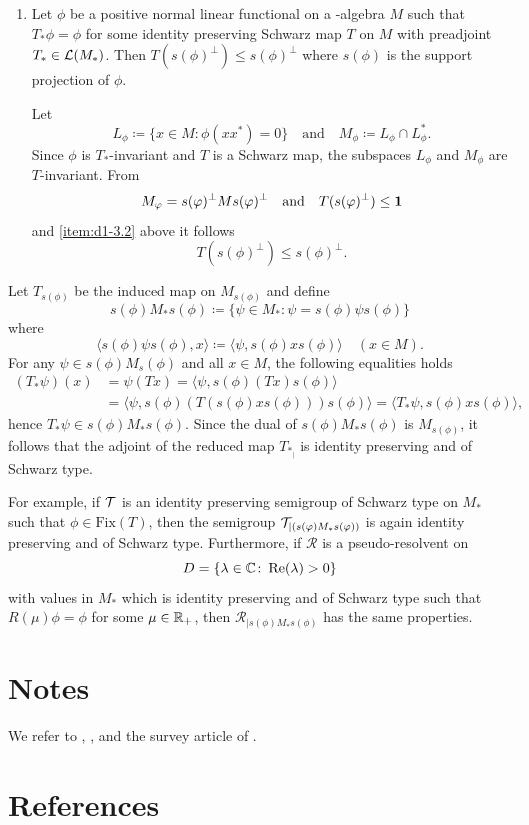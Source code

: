 \begin{enumerate}[1., wide, labelindent=.25em]
\item
Let $ \phi $ be a positive normal linear functional on a \WA-algebra $ M $ such that $ T_{*}\phi = \phi $ for some identity preserving Schwarz map $ T $ on $ M $ with preadjoint 
$ T_{*} \in \mathcal{L}(M_{*}) $.
Then $ T(s(\phi)^{\perp}) \leq s(\phi)^{\perp} $ where $ s(\phi) $ is the support projection of\/ $ \phi $.

Let 
%
\[
	L_\phi \coloneq \{ x \in M \colon \phi(xx^{*}) = 0 \}
	\quad \text{and} \quad
	M_\phi \coloneq L_\phi \cap L_\phi^{*} .
\]
%
Since $ \phi $ is $ T_{*} $-invariant and $ T $ is a Schwarz map, the subspaces $ L_{\phi} $ and $ M_{\phi} $ are $ T $-invariant.
From 
\[ 
M_{\phi} = s(\phi)^{\perp}Ms(\phi)^{\perp} 
\quad \text{and} \quad 
T(s(\phi)^{\perp}) \leq \1 
\]
and \eqref{item:d1-3.2} above it follows 
\[ 
T(s(\phi)^{\perp}) \leq s(\phi)^{\perp}  .
\]
\end{enumerate}
Let $ T_{s(\phi)} $ be the induced map on $ M_{s(\phi)} $ and define
\[
	s(\phi)M_{*}s(\phi) \coloneq \{\psi \in M_{*} \colon \psi = s(\phi)\psi s(\phi)\}
\]
where 
\[ 
\langle s(\phi)\psi s(\phi),x \rangle \coloneq 
    \langle \psi,s(\phi)xs(\phi) \rangle \quad  (  x \in M  ).
\]
For any $\psi \in s(\phi)M_s(\phi)$ and all $x \in M$, the following equalities holds
\begin{align*}
(T_{*}\psi)(x) &= \psi(Tx) = \langle \psi,s(\phi)(Tx)s(\phi) \rangle \\
	&= \langle \psi,s(\phi)(T(s(\phi)xs(\phi)))s(\phi) \rangle = \langle T_{*}\psi,s(\phi)xs(\phi) \rangle,
\end{align*}
hence $ T_{*}\psi \in s(\phi)M_{*}s(\phi) $.
Since the dual of\/ $ s(\phi)M_{*}s(\phi) $ is $ M_{s(\phi)} $, it follows that the adjoint of the reduced map $ T_{*_{|}} $ is identity preserving and of Schwarz type.

For example, if\/ $ \mathcal{T} $ is an identity preserving semigroup of Schwarz type on $ M_{*} $ such that $ \phi \in \text{Fix}(T) $, then the semigroup $ \TT_{\vert (s(\phi)M_{*}s(\phi))} $ is again identity preserving and of Schwarz type.
Furthermore, if  $ \mathcal{R} $ is a pseudo-resolvent on 
%
\[
	D = \{\lambda \in \mathbb{C} \colon \mathop{}\!\mathrm{Re}(\lambda) > 0\} 
\]
%
with values in $ M_{*} $ which is identity preserving and of Schwarz type such that $ R(\mu)\phi = \phi $ for some $ \mu \in \mathbb{R}_{+} $, then $ \mathcal{R}_{\vert s(\phi)M_{*}s(\phi)} $ has the same properties.

\section*{Notes}
We refer to \textcite{brattelirobinson:1979}, \textcite{brattelirobinson:1981}, \textcite{davies:1976} and the survey article of \textcite{oseledets:1984}.
\section*{References}
{\RaggedRight
  \printbibliography[heading=none]
 }